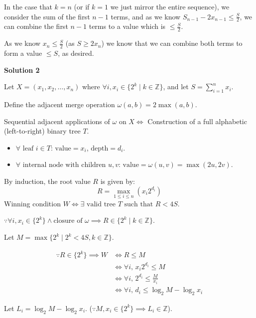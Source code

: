 \begin{enumerate}
 In the case that $k=n$ (or if $k=1$ we just mirror the entire sequence), we consider the sum of the first $n-1$ terms, and as we know $S_{n-1}-2x_{n-1}\le \frac{S}{2}$, we can combine the first $n-1$ terms to a value which is $\le \frac{S}{2}$.

 As we know $x_n\le \frac{S}{2}$ (as $S\ge 2x_n$) we know that we can combine both terms to form a value $\le S$, as desired.

 



\textbf{Solution 2}

Let $X = (x_1, x_2, \dots, x_n)$ where $\forall i, x_i \in \{2^k \mid k \in \mathbb{Z}\}$, and let $S =\sum_{i=1}^n x_i$. 

 Define the adjacent merge operation $\omega(a, b) = 2\max(a, b)$. 

 Sequential adjacent applications of $\omega$ on $X \iff$ Construction of a full alphabetic (left-to-right) binary tree $T$.

 
            \begin{itemize}
        \item $\forall \text{ leaf } i \in T$: $\text{value} = x_i$, $\text{depth} = d_i$.
            \end{itemize}
            
            \begin{itemize}
        \item $\forall \text{ internal node with children } u, v$: $\text{value} = \omega(u,v) = \max(2u, 2v)$.
            \end{itemize}
            By induction, the root value $R$ is given by:
 \[R = \max_{1 \le i \le n} (x_i 2^{d_i})\]Winning condition $W \iff \exists \text{ valid tree } T \text{ such that } R < 4S$.

 $\because \forall i, x_i \in \{2^k\} \land \text{closure of } \omega \implies R \in \{2^k \mid k \in \mathbb{Z}\}$.

 Let $M = \max \{2^k \mid 2^k < 4S, k \in \mathbb{Z}\}$.

 \begin{align*}\because R \in \{2^k\} \implies W &\iff R \le M \\&\iff \forall i, \, x_i 2^{d_i} \le M \\&\iff \forall i, \, 2^{d_i} \le \frac{M}{x_i} \\&\iff \forall i, \, d_i \le \log_2 M - \log_2 x_i\end{align*}


 Let $L_i = \log_2 M - \log_2 x_i$. ($\because M, x_i \in \{2^k\} \implies L_i \in \mathbb{Z}$). 


\end{enumerate}
